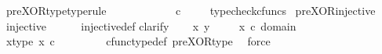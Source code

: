 \begin{isabellebody}
\isanewline
{}\isamarkupfalse%
\ pre{\isacharunderscore}{\kern0pt}XOR{\isacharunderscore}{\kern0pt}type{\isacharbrackleft}{\kern0pt}type{\isacharunderscore}{\kern0pt}rule{\isacharbrackright}{\kern0pt}{\isacharcolon}{\kern0pt}\ \isanewline
\ \ {\isachardoublequoteopen}{\isasymlangle}{\isasymt}{\isacharcomma}{\kern0pt}\ {\isasymf}{\isasymrangle}\ {\isasymamalg}\ {\isasymlangle}{\isasymf}{\isacharcomma}{\kern0pt}\ {\isasymt}{\isasymrangle}\ {\isacharcolon}{\kern0pt}\ {\isasymone}{\isasymCoprod}{\isasymone}\ {\isasymrightarrow}\ {\isasymOmega}\ {\isasymtimes}\isactrlsub c\ {\isasymOmega}{\isachardoublequoteclose}\isanewline
%
\isadelimproof
\ \ %
\endisadelimproof
%
\isatagproof
{}\isamarkupfalse%
\ typecheck{\isacharunderscore}{\kern0pt}cfuncs%
\endisatagproof
{\isafoldproof}%
%
\isadelimproof
\isanewline
%
\endisadelimproof
\isanewline
{}\isamarkupfalse%
\ pre{\isacharunderscore}{\kern0pt}XOR{\isacharunderscore}{\kern0pt}injective{\isacharcolon}{\kern0pt}\isanewline
\ {\isachardoublequoteopen}injective{\isacharparenleft}{\kern0pt}{\isasymlangle}{\isasymt}{\isacharcomma}{\kern0pt}\ {\isasymf}{\isasymrangle}\ {\isasymamalg}{\isasymlangle}{\isasymf}{\isacharcomma}{\kern0pt}\ {\isasymt}{\isasymrangle}{\isacharparenright}{\kern0pt}{\isachardoublequoteclose}\isanewline
%
\isadelimproof
\ %
\endisadelimproof
%
\isatagproof
{}\isamarkupfalse%
\ injective{\isacharunderscore}{\kern0pt}def\isanewline
{}\isamarkupfalse%
{\isacharparenleft}{\kern0pt}clarify{\isacharparenright}{\kern0pt}\isanewline
\ \ \isamarkupfalse%
\ x\ y\ \isanewline
\ \ \isamarkupfalse%
\ {\isachardoublequoteopen}x\ {\isasymin}\isactrlsub c\ domain\ {\isacharparenleft}{\kern0pt}{\isasymlangle}{\isasymt}{\isacharcomma}{\kern0pt}{\isasymf}{\isasymrangle}\ {\isasymamalg}\ {\isasymlangle}{\isasymf}{\isacharcomma}{\kern0pt}{\isasymt}{\isasymrangle}{\isacharparenright}{\kern0pt}{\isachardoublequoteclose}\ \isanewline
\ \ \isamarkupfalse%
\ \isamarkupfalse%
\ x{\isacharunderscore}{\kern0pt}type{\isacharcolon}{\kern0pt}\ {\isachardoublequoteopen}x\ {\isasymin}\isactrlsub c\ {\isasymone}{\isasymCoprod}{\isasymone}{\isachardoublequoteclose}\ \ \isanewline
\ \ \ \ \isamarkupfalse%
\ cfunc{\isacharunderscore}{\kern0pt}type{\isacharunderscore}{\kern0pt}def\ pre{\isacharunderscore}{\kern0pt}XOR{\isacharunderscore}{\kern0pt}type\ \isamarkupfalse%
\ force\isanewline
\ \ \isamarkupfalse%
\ \isamarkupfalse%

\end{isabellebody}
